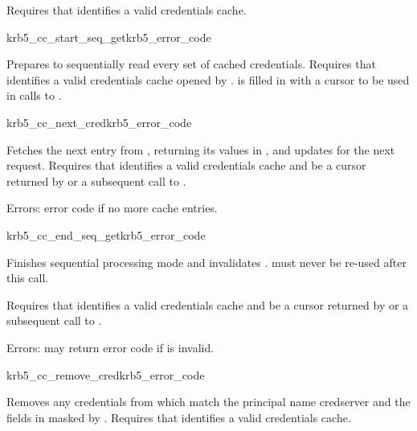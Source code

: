 Requires that  identifies a valid credentials cache.

\begin{funcdecl}{krb5_cc_start_seq_get}{krb5_error_code}{\funcin}
\funcout
{}
\end{funcdecl}

Prepares to sequentially read every set of cached credentials.
Requires that  identifies a valid credentials cache opened by
.
 is filled in with a cursor to be used in calls to
.

\begin{funcdecl}{krb5_cc_next_cred}{krb5_error_code}{\funcin}
\funcout
{}
\funcinout
{}
\end{funcdecl}

Fetches the next entry from , returning its values in
, and updates  for the next request.
Requires that  identifies a valid credentials cache and
 be a cursor returned by
 or a subsequent call to
.

Errors: error code if no more cache entries.

\begin{funcdecl}{krb5_cc_end_seq_get}{krb5_error_code}{\funcin}
\end{funcdecl}

Finishes sequential processing mode and invalidates .
 must never be re-used after this call.

Requires that  identifies a valid credentials cache and
 be a cursor returned by
 or a subsequent call to
.

Errors: may return error code if  is invalid.


\begin{funcdecl}{krb5_cc_remove_cred}{krb5_error_code}{\funcin}
\end{funcdecl}

Removes any credentials from  which match the principal
name {cred{\ptsto}server} and the fields in  masked by
.
Requires that  identifies a valid credentials cache.


